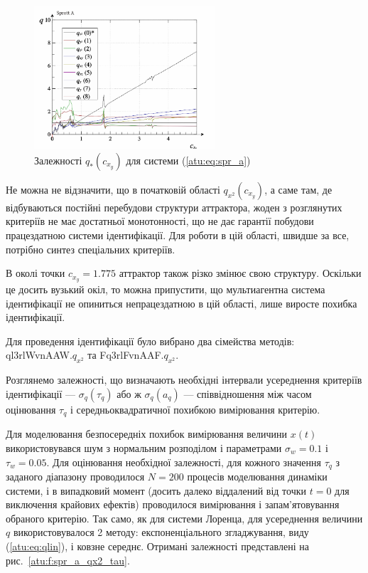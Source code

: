 \begin{figure}[htb!]
\begin{center}
  \includegraphics[width=0.60\textwidth]{p/cha/spr_a/sprott_a_q-p_c_x_y.png}
\end{center}
\caption{Залежності $q_{*}(c_{x_y})$ для системи (\ref{atu:eq:spr_a})}
\label{atu:f:spr_a_q}
\end{figure}

Не можна не відзначити, що в початковій області
$q_{x^2}(c_{x_y})$, а саме там, де відбуваються постійні перебудови
структури аттрактора, жоден з розглянутих критеріїв не
має достатньої монотонності, що не дає гарантії побудови
працездатною системи ідентифікації. Для роботи в цій області,
швидше за все, потрібно синтез спеціальних критеріїв.

В околі точки $c_{x_y} = 1.775$ аттрактор також різко змінює свою
структуру. Оскільки це досить вузький окіл, то можна припустити, що
мультиагентна система ідентифікації не опиниться непрацездатною в цій області,
лише виросте похибка ідентифікації.

Для проведення ідентифікації було вибрано два сімейства
методів:
ql3rlWvnAAW.$q_{x^2}$ та
Fq3rlFvnAAF.$q_{x^2}$.

Розглянемо залежності, що визначають необхідні інтервали
усереднення критеріїв ідентифікації
--- $\sigma_q(\tau_q)$
або ж
$\sigma_q (a_q)$ --- співвідношення між часом оцінювання
$\tau_q$ і середньоквадратичної похибкою вимірювання критерію.

Для моделювання безпосередніх похибок вимірювання величини
$x (t)$ використовувався шум з нормальним розподілом і
параметрами
$\sigma_w = 0.1$ і
$\tau_w = 0.05$. Для оцінювання необхідної залежності, для кожного
значення
$\tau_q$ з заданого діапазону проводилося
$N = 200$ процесів моделювання динаміки системи, і в випадковий
момент (досить далеко віддалений від точки
$t = 0$ для виключення крайових ефектів) проводилося вимірювання
і запам'ятовування обраного критерію. Так само, як для системи
Лоренца, для усереднення величини
$q$ використовувалося 2 методу: експоненціального згладжування,
виду (\ref{atu:eq:qlin}), і ковзне середнє. Отримані залежності
представлені на рис.~\ref{atu:f:spr_a_qx2_tau}.


